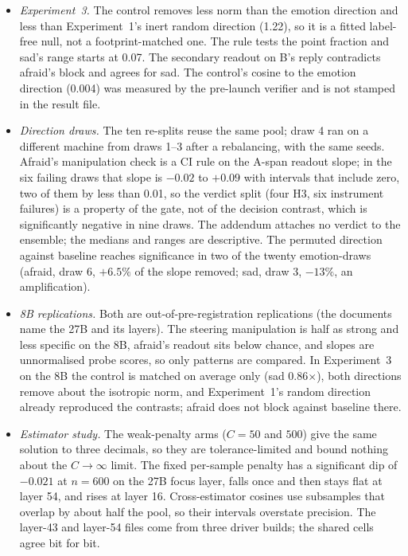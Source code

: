 \documentclass{article}
\begin{document}
\begin{itemize}[leftmargin=1.2em,itemsep=1pt,topsep=2pt]
\item \emph{Experiment~3.} The control removes less norm than the emotion direction and less than Experiment~1's inert random direction (1.22), so it is a fitted label-free null, not a footprint-matched one. The rule tests the point fraction and sad's range starts at 0.07. The secondary readout on B's reply contradicts afraid's block and agrees for sad. The control's cosine to the emotion direction (0.004) was measured by the pre-launch verifier and is not stamped in the result file.
\item \emph{Direction draws.} The ten re-splits reuse the same pool; draw 4 ran on a different machine from draws 1--3 after a rebalancing, with the same seeds. Afraid's manipulation check is a CI rule on the A-span readout slope; in the six failing draws that slope is $-0.02$ to $+0.09$ with intervals that include zero, two of them by less than 0.01, so the verdict split (four H3, six instrument failures) is a property of the gate, not of the decision contrast, which is significantly negative in nine draws. The addendum attaches no verdict to the ensemble; the medians and ranges are descriptive. The permuted direction against baseline reaches significance in two of the twenty emotion-draws (afraid, draw 6, $+6.5\%$ of the slope removed; sad, draw 3, $-13\%$, an amplification).
\item \emph{8B replications.} Both are out-of-pre-registration replications (the documents name the 27B and its layers). The steering manipulation is half as strong and less specific on the 8B, afraid's readout sits below chance, and slopes are unnormalised probe scores, so only patterns are compared. In Experiment~3 on the 8B the control is matched on average only (sad 0.86$\times$), both directions remove about the isotropic norm, and Experiment~1's random direction already reproduced the contrasts; afraid does not block against baseline there.
\item \emph{Estimator study.} The weak-penalty arms ($C = 50$ and $500$) give the same solution to three decimals, so they are tolerance-limited and bound nothing about the $C \to \infty$ limit. The fixed per-sample penalty has a significant dip of $-0.021$ at $n = 600$ on the 27B focus layer, falls once and then stays flat at layer 54, and rises at layer 16. Cross-estimator cosines use subsamples that overlap by about half the pool, so their intervals overstate precision. The layer-43 and layer-54 files come from three driver builds; the shared cells agree bit for bit.
\end{itemize}
\end{document}
